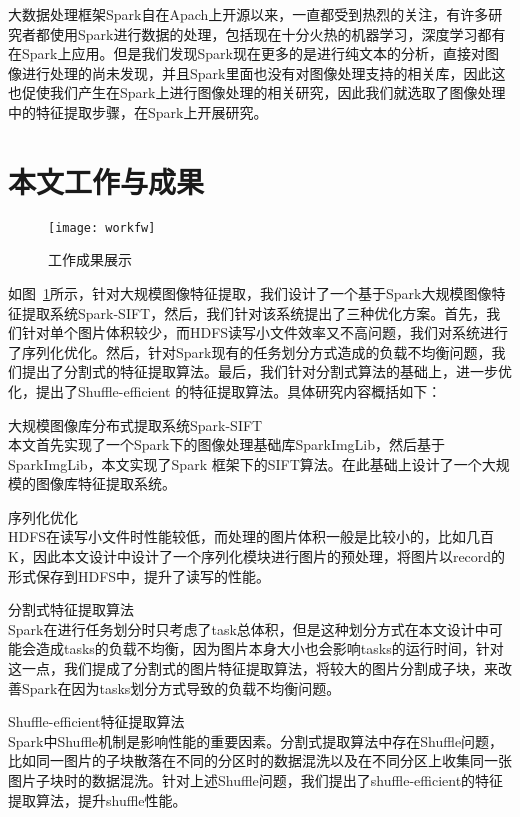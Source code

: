 大数据处理框架Spark自在Apach上开源以来，一直都受到热烈的关注，有许多研究者都使用Spark进行数据的处理，包括现在十分火热的机器学习，深度学习都有在Spark上应用。但是我们发现Spark现在更多的是进行纯文本的分析，直接对图像进行处理的尚未发现，并且Spark里面也没有对图像处理支持的相关库，因此这也促使我们产生在Spark上进行图像处理的相关研究，因此我们就选取了图像处理中的特征提取步骤，在Spark上开展研究。

\section{本文工作与成果}
\begin{figure}[htp]
\centering
\texttt{[image: workfw]}
\caption{工作成果展示}
\label{fig:workfw}
\end{figure}
如图~\ref{fig:workfw}所示，针对大规模图像特征提取，我们设计了一个基于Spark大规模图像特征提取系统Spark-SIFT，然后，我们针对该系统提出了三种优化方案。首先，我们针对单个图片体积较少，而HDFS读写小文件效率又不高问题，我们对系统进行了序列化优化。然后，针对Spark现有的任务划分方式造成的负载不均衡问题，我们提出了分割式的特征提取算法。最后，我们针对分割式算法的基础上，进一步优化，提出了Shuffle-efficient 的特征提取算法。具体研究内容概括如下：
\begin{compactenum}
\item 大规模图像库分布式提取系统Spark-SIFT\\本文首先实现了一个Spark下的图像处理基础库SparkImgLib，然后基于SparkImgLib，本文实现了Spark 框架下的SIFT算法。在此基础上设计了一个大规模的图像库特征提取系统。
\item 序列化优化\\HDFS在读写小文件时性能较低，而处理的图片体积一般是比较小的，比如几百K，因此本文设计中设计了一个序列化模块进行图片的预处理，将图片以record的形式保存到HDFS中，提升了读写的性能。
\item 分割式特征提取算法\\Spark在进行任务划分时只考虑了task总体积，但是这种划分方式在本文设计中可能会造成tasks的负载不均衡，因为图片本身大小也会影响tasks的运行时间，针对这一点，我们提成了分割式的图片特征提取算法，将较大的图片分割成子块，来改善Spark在因为tasks划分方式导致的负载不均衡问题。
\item Shuffle-efficient特征提取算法\\Spark中Shuffle机制是影响性能的重要因素。分割式提取算法中存在Shuffle问题，比如同一图片的子块散落在不同的分区时的数据混洗以及在不同分区上收集同一张图片子块时的数据混洗。针对上述Shuffle问题，我们提出了shuffle-efficient的特征提取算法，提升shuffle性能。
\end{compactenum}

